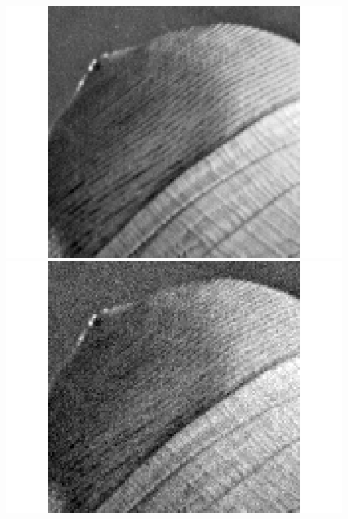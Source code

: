 \documentclass[runningheads]{llncs}
\begin{document}
  \begin{figure}[!h]
    \centering
    \begin{minipage}{0.45\linewidth}
    \includegraphics[width=\linewidth]{hat_origine}
    \end{minipage}
    \begin{minipage}{0.45\linewidth}
    \includegraphics[width=\linewidth]{hat_noisy}
    \end{minipage}
    \begin{minipage}{0.45\linewidth}

\end{minipage}
\end{figure}
\end{document}
